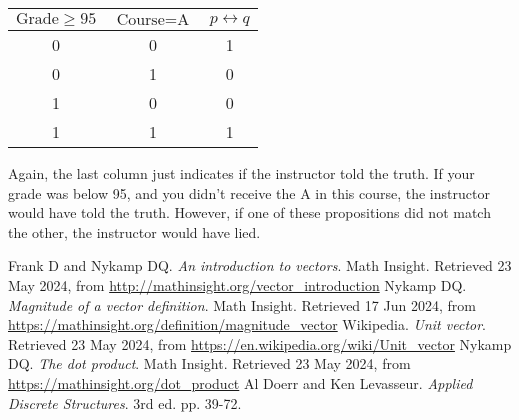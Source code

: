 \documentclass{article}
\begin{document}
\bigskip
\begin{center}
  \begin{tabular}{| c | c | c |}
    \hline
    $\text{Grade} \geq 95$ & $\text{Course} = \text{A}$ & $p \leftrightarrow q$ \\
    \hline
    0 & 0 & 1 \\
    0 & 1 & 0 \\
    1 & 0 & 0 \\
    1 & 1 & 1 \\
    \hline
  \end{tabular}
\end{center}
\bigskip

Again, the last column just indicates if the instructor told the truth. If your
grade was below 95, and you didn't receive the A in this course, the instructor
would have told the truth. However, if one of these propositions did not match
the other, the instructor would have lied.



\clearpage
{}
{}

\begin{thebibliography}{9}
  Frank D and Nykamp DQ. \emph{An introduction to vectors}. Math
  Insight. Retrieved 23 May 2024, from
  \url{http://mathinsight.org/vector_introduction}
  Nykamp DQ. \emph{Magnitude of a vector definition}. Math
  Insight. Retrieved 17 Jun 2024, from
  \url{https://mathinsight.org/definition/magnitude_vector}
  Wikipedia. \emph{Unit vector}. Retrieved 23 May 2024, from
  \url{https://en.wikipedia.org/wiki/Unit_vector}
  Nykamp DQ. \emph{The dot product}. Math Insight. Retrieved 23 May 2024,
  from \url{https://mathinsight.org/dot_product}
  Al Doerr and Ken Levasseur. \emph{Applied Discrete Structures}.
  3rd ed. pp. 39-72.
\end{thebibliography}
\end{document}
